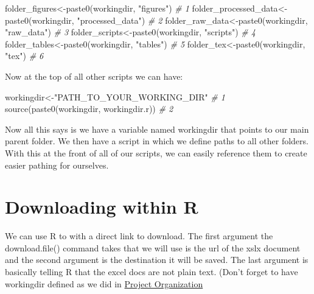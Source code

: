 \documentclass[
]{book}
\newenvironment{Shaded}{\begin{snugshade}}{\end{snugshade}}
\newcommand{\CommentTok}[1]{\textcolor[rgb]{0.56,0.35,0.01}{\textit{#1}}}
\newcommand{\FunctionTok}[1]{\textcolor[rgb]{0.00,0.00,0.00}{#1}}
\newcommand{\NormalTok}[1]{#1}
\newcommand{\OtherTok}[1]{\textcolor[rgb]{0.56,0.35,0.01}{#1}}
\newcommand{\StringTok}[1]{\textcolor[rgb]{0.31,0.60,0.02}{#1}}
\begin{document}
\begin{Shaded}
\begin{Highlighting}[]
\NormalTok{folder\_figures}\OtherTok{\textless{}{-}}\FunctionTok{paste0}\NormalTok{(workingdir, }\StringTok{"figures"}\NormalTok{)                }\CommentTok{\# 1}
\NormalTok{folder\_processed\_data}\OtherTok{\textless{}{-}}\FunctionTok{paste0}\NormalTok{(workingdir, }\StringTok{"processed\_data"}\NormalTok{)  }\CommentTok{\# 2}
\NormalTok{folder\_raw\_data}\OtherTok{\textless{}{-}}\FunctionTok{paste0}\NormalTok{(workingdir, }\StringTok{"raw\_data"}\NormalTok{)              }\CommentTok{\# 3}
\NormalTok{folder\_scripts}\OtherTok{\textless{}{-}}\FunctionTok{paste0}\NormalTok{(workingdir, }\StringTok{"scripts"}\NormalTok{)                }\CommentTok{\# 4}
\NormalTok{folder\_tables}\OtherTok{\textless{}{-}}\FunctionTok{paste0}\NormalTok{(workingdir, }\StringTok{"tables"}\NormalTok{)                  }\CommentTok{\# 5}
\NormalTok{folder\_tex}\OtherTok{\textless{}{-}}\FunctionTok{paste0}\NormalTok{(workingdir, }\StringTok{"tex"}\NormalTok{)                        }\CommentTok{\# 6}
\end{Highlighting}
\end{Shaded}

Now at the top of all other scripts we can have:

\begin{Shaded}
\begin{Highlighting}[]
\NormalTok{workingdir}\OtherTok{\textless{}{-}}\StringTok{"PATH\_TO\_YOUR\_WORKING\_DIR"}    \CommentTok{\# 1}
\FunctionTok{source}\NormalTok{(}\FunctionTok{paste0}\NormalTok{(workingdir, workingdir.r))  }\CommentTok{\# 2}
\end{Highlighting}
\end{Shaded}

Now all this says is we have a variable named workingdir that points to our main parent folder. We then have a script in which we define paths to all other folders. With this at the front of all of our scripts, we can easily reference them to create easier pathing for ourselves.

\hypertarget{downloading-within-r}{%
\section{Downloading within R}\label{downloading-within-r}}

We can use R to with a direct link to download. The first argument the download.file() command takes that we will use is the url of the xslx document and the second argument is the destination it will be saved. The last argument is basically telling R that the excel docs are not plain text. (Don't forget to have workingdir defined as we did in \href{https://jmwestenberg.github.io/courses/rcourse/intro/lesson1_03/}{Project Organization}
\end{document}
